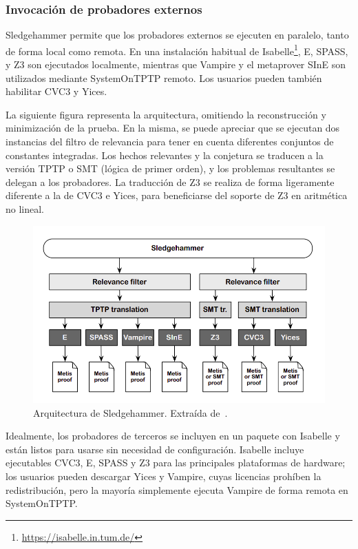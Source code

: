\documentclass[12pt]{book}
\begin{document}
\subsubsection{Invocación de probadores externos}

Sledgehammer permite que los probadores externos se ejecuten en paralelo, tanto de forma local como remota. En una instalación habitual de Isabelle\footnote{\url{https://isabelle.in.tum.de/}}, E, SPASS, y Z3 son ejecutados localmente, mientras que Vampire y el metaprover SInE son utilizados mediante SystemOnTPTP remoto. Los usuarios pueden también habilitar CVC3 y Yices.

La siguiente figura representa la arquitectura, omitiendo la reconstrucción y minimización de la prueba. En la misma, se puede apreciar que se ejecutan dos instancias del filtro de relevancia para tener en cuenta diferentes conjuntos de constantes integradas. Los hechos relevantes y la conjetura se traducen a la versión TPTP o SMT (lógica de primer orden), y los problemas resultantes se delegan a los probadores. La traducción de Z3 se realiza de forma ligeramente diferente a la de CVC3 e Yices, para beneficiarse del soporte de Z3 en aritmética no lineal.

\begin{figure}[H]
	\centering
	\includegraphics[width=\textwidth]{Sledgehammer_arquitecture.png}
	\caption{Arquitectura de Sledgehammer. Extraída de~\cite{proof_and_disproof}.}\label{fig:Sledgehammer_arquitecture}
\end{figure}

Idealmente, los probadores de terceros se incluyen en un paquete con Isabelle y están listos para usarse sin necesidad de configuración. Isabelle incluye ejecutables CVC3, E, SPASS y Z3 para las principales plataformas de hardware; los usuarios pueden descargar Yices y Vampire, cuyas licencias prohíben la redistribución, pero la mayoría simplemente ejecuta Vampire de forma remota en SystemOnTPTP.\@
\end{document}
